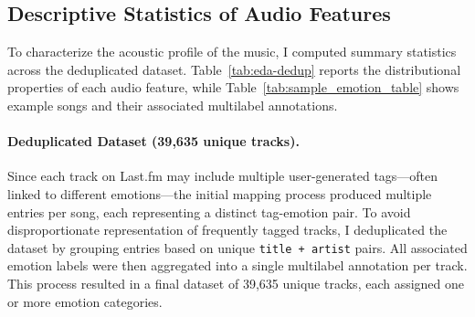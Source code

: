 \documentclass{article}
\begin{document}
\begin{table}[H]
\centering
{}
\caption{Sample records from the final dataset with audio features and emotion labels.}
\label{tab:final-sample}
\end{table}

\subsection{Descriptive Statistics of Audio Features}

To characterize the acoustic profile of the music, I computed summary statistics across the deduplicated dataset. Table~\ref{tab:eda-dedup} reports the distributional properties of each audio feature, while Table~\ref{tab:sample_emotion_table} shows example songs and their associated multilabel annotations.

\paragraph{Deduplicated Dataset (39,635 unique tracks).}
Since each track on Last.fm may include multiple user-generated tags—often linked to different emotions—the initial mapping process produced multiple entries per song, each representing a distinct tag-emotion pair. To avoid disproportionate representation of frequently tagged tracks, I deduplicated the dataset by grouping entries based on unique \texttt{title + artist} pairs. All associated emotion labels were then aggregated into a single multilabel annotation per track. This process resulted in a final dataset of 39,635 unique tracks, each assigned one or more emotion categories.
\end{document}
